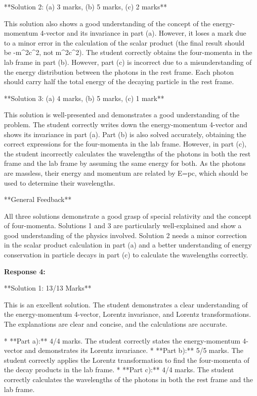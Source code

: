 \documentclass[a4paper,11pt]{article}
\begin{document}
**Solution 2: (a) 3 marks, (b) 5 marks, (c) 2 marks**

This solution also shows a good understanding of the concept of the energy-momentum 4-vector and its invariance in part (a). However, it loses a mark due to a minor error in the calculation of the scalar product (the final result should be -m^2c^2, not m^2c^2). The student correctly obtains the four-momenta in the lab frame in part (b). However, part (c) is incorrect due to a misunderstanding of the energy distribution between the photons in the rest frame. Each photon should carry half the total energy of the decaying particle in the rest frame.

**Solution 3: (a) 4 marks, (b) 5 marks, (c) 1 mark**

This solution is well-presented and demonstrates a good understanding of the problem. The student correctly writes down the energy-momentum 4-vector and shows its invariance in part (a). Part (b) is also solved accurately, obtaining the correct expressions for the four-momenta in the lab frame. However, in part (c), the student incorrectly calculates the wavelengths of the photons in both the rest frame and the lab frame by assuming the same energy for both. As the photons are massless, their energy and momentum are related by E=pc, which should be used to determine their wavelengths.


**General Feedback**

All three solutions demonstrate a good grasp of special relativity and the concept of four-momenta. Solutions 1 and 3 are particularly well-explained and show a good understanding of the physics involved. Solution 2 needs a minor correction in the scalar product calculation in part (a) and a better understanding of energy conservation in particle decays in part (c) to calculate the wavelengths correctly.

\textbf{Response 4:}

**Solution 1: 13/13 Marks**

This is an excellent solution. The student demonstrates a clear understanding of the energy-momentum 4-vector, Lorentz invariance, and Lorentz transformations. The explanations are clear and concise, and the calculations are accurate.

*   **Part a):** 4/4 marks. The student correctly states the energy-momentum 4-vector and demonstrates its Lorentz invariance.
*   **Part b):** 5/5 marks. The student correctly applies the Lorentz transformation to find the four-momenta of the decay products in the lab frame.
*   **Part c):** 4/4 marks. The student correctly calculates the wavelengths of the photons in both the rest frame and the lab frame.
\end{document}
